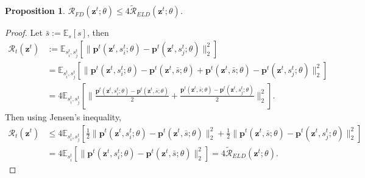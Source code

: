 \documentclass{article} %
\newtheorem{proposition}{Proposition}
\begin{document}
\begin{proposition}
$\mathcal{R}_{FD}(\mathbf{z}^{t}; \theta) \leq 4 \mathcal{\tilde{R}}_{ELD}(\mathbf{z}^{t}; \theta)$.
\end{proposition}
\begin{proof}
Let $\bar{s} := \mathbb{E}_{s}[s]$, then
\begin{align}
\mathcal{R}_t(\mathbf{z}^t) &:= \mathbb{E}_{s_i^t, s_j^t} \left[ \lVert \mathbf{p}^t(\mathbf{z}^t, s_i^t; \theta) - \mathbf{p}^t(\mathbf{z}^t, s_j^t; \theta) \rVert^2_2 \right] \\
&= \mathbb{E}_{s_i^t, s_j^t} \left[ \lVert \mathbf{p}^t(\mathbf{z}^t, s_i^t; \theta) -\mathbf{p}^t(\mathbf{z}^t, \bar{s}; \theta) + \mathbf{p}^t(\mathbf{z}^t, \bar{s}; \theta) - \mathbf{p}^t(\mathbf{z}^t, s_j^t; \theta) \rVert^2_2 \right]\\
&= 4 \mathbb{E}_{s_i^t, s_j^t} \left[ \lVert \frac{\mathbf{p}^t(\mathbf{z}^t, s_i^t; \theta) -\mathbf{p}^t(\mathbf{z}^t, \bar{s}; \theta)}{2} + \frac{\mathbf{p}^t(\mathbf{z}^t, \bar{s}; \theta) - \mathbf{p}^t(\mathbf{z}^t, s_j^t; \theta)}{2} \rVert^2_2 \right].
\end{align}
Then using Jensen's inequality,
\begin{align}
\mathcal{R}_t(\mathbf{z}^t)  &\leq 4\mathbb{E}_{s_i^t, s_j^t} \left[ \frac{1}{2} \lVert \mathbf{p}^t(\mathbf{z}^t, s_i^t; \theta) -\mathbf{p}^t(\mathbf{z}^t, \bar{s}; \theta) \rVert^2_2 + \frac{1}{2} \lVert \mathbf{p}^t(\mathbf{z}^t, \bar{s}; \theta) - \mathbf{p}^t(\mathbf{z}^t, s_j^t; \theta) \rVert^2_2 \right]\\
&=  4\mathbb{E}_{s_i^t} \left[ \lVert \mathbf{p}^t(\mathbf{z}^t, s_i^t; \theta)- \mathbf{p}^t(\mathbf{z}^t, \bar{s}; \theta)  \rVert^2_2 \right] = 4 \mathcal{\tilde{R}}_{ELD}(\mathbf{z}^{t}; \theta).
\end{align}
\end{proof}
\end{document}
